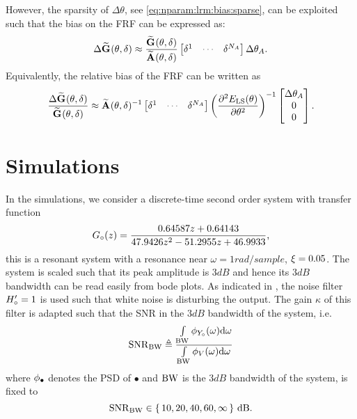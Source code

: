However, the sparsity of $\Delta\theta$, see \eqref{eq:nparam:lrm:bias:sparse}, can be exploited such that the bias on the \gls{FRF} can be expressed as:
\begin{equation}
  \Delta \LocalModel{G}(\theta,\dW)
  \approx
  \frac{\LocalModel{G}(\theta, \dW)}
           {\LocalModel{A}(\theta, \dW)}
  \begin{bmatrix}
    \dW^1 & \deemph{\cdots} & \dW^{\order{A}}
  \end{bmatrix}
  \Delta \theta_A
  \text{.}
\end{equation}
Equivalently, the relative bias of the \gls{FRF} can be written as
\begin{equation}
\frac{\Delta \LocalModel{G}(\theta,\dW)}{\LocalModel{G}(\theta,\dW)}
\approx
\LocalModel{A}(\theta,\dW)^{-1}
\begin{bmatrix}
    \dW^1 & \deemph{\cdots} & \dW^{\order{A}}
  \end{bmatrix}
  \left(  \PartialDerivative[2]{\ELSCost{\theta}}{ \theta^2 } \right)^{-1}
  \begin{bmatrix}
  \Delta\theta_A\\
  0\\
  0\\
  \end{bmatrix}
  \text{.}
\end{equation}


\section{Simulations}
\label{sec:simulations}

In the simulations, we consider a discrete-time second order system with transfer function
\begin{equation}
{G}_{\circ}(z) = \frac{0.64587 z + 0.64143}
                                      {47.9426 z^2 - 51.2955 z + 46.9933}
                                      \text{,}
\end{equation}
this is a resonant system with a resonance near $\omega=1\unit{rad/sample}$, $\xi_{}=0.05$.
The system is scaled such that its peak amplitude is $3\unit{dB}$ and hence its $3\unit{dB}$ bandwidth can be read easily from bode plots.
As indicated in , the noise filter ${H}_{\circ}' = 1$ is used such that white noise is disturbing the output.
The gain $\kappa$ of this filter is adapted such that the \gls{SNR} in the $3\unit{dB}$ bandwidth of the system, i.e.
\begin{equation}
  \mathrm{SNR}_{\mathrm{BW}} \triangleq
  \frac{\int\limits_{\mathrm{BW}} \phi_{{Y}_{\circ}}(\omega) \mathrm{d}\omega}
            {\int\limits_{\mathrm{BW}} \phi_{V}(\omega) \mathrm{d}{\omega}}
\end{equation}
where $\phi_{\bullet}$ denotes the \gls{PSD} of $\bullet$ and $\mathrm{BW}$ is the $3 \unit{dB}$ bandwidth of the system, is fixed to \[
\mathrm{SNR}_{\mathrm{BW}} \in \set{10, 20, 40, 60, \infty} \,\mathrm{dB}\text{.}
\]

